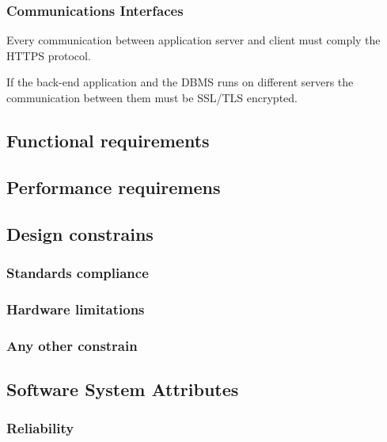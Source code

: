 \documentclass{article}
\begin{document}
	
	\subsubsection{Communications Interfaces}
	Every communication between application server and client must comply the HTTPS protocol.
	
	\bigskip
	If the back-end application and the DBMS runs on different servers the communication between them must be SSL/TLS encrypted.
	
	
	\subsection{Functional requirements}
	
	
	
	\subsection{Performance requiremens}
	
	
	
	\subsection{Design constrains}
	
	
	
	\subsubsection{Standards compliance}
	
	
	
	\subsubsection{Hardware limitations}
	
	
	
	\subsubsection{Any other constrain}
	
	
	
	\subsection{Software System Attributes}
	
	
	
	\subsubsection{Reliability}
	
\end{document}
